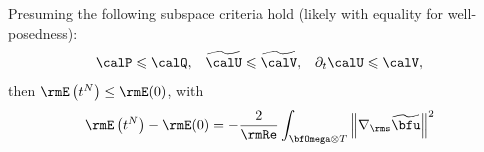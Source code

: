     \begin{theorem}
        Presuming the following subspace criteria hold (likely with equality for well-posedness):
        \begin{align}
                        \calP  \leqslant  \calQ,  &&
            \widetilde{\calU}  \leqslant  \widetilde{\calV},  &&
            \partial_{t}\calU  \leqslant  \calV,
        \end{align}
        then $\rmE\left(t^{N}\right)  \leq  \rmE(0)$, with
        \begin{equation}
            \rmE\left(t^{N}\right) - \rmE(0)  =  - \frac{2}{\rmRe}\int_{\bfOmega\otimes T}\left\|\nabla_{\rms}\widetilde{\bfu}\right\|^{2}
        \end{equation}
    \end{theorem}
